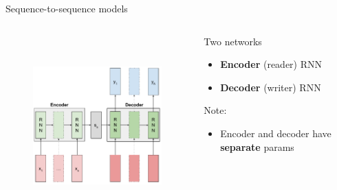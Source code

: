 \documentclass[12pt,aspectratio=169,handout]{beamer}
\begin{document}
\begin{frame}{Sequence-to-sequence models}
\vspace{-2em}
\begin{columns}[T] %
	\begin{column}{.59\textwidth}
	
		\begin{figure}[h]
		\includegraphics[height=7cm]{img/sequence_to_sequence_boxed.pdf}
	\end{figure}
	
	\end{column}
	\pause
	\begin{column}{.39\textwidth}
		\vspace{1cm}
		Two networks
		\begin{itemize}
			\item \textbf{Encoder} (reader) RNN
			\item \textbf{Decoder} (writer) RNN
		\end{itemize}
		\pause
		Note:
		\begin{itemize}
			\item Encoder and decoder have \textbf{separate} params
		\end{itemize}
	\end{column}
\end{columns}
\end{frame}
	
	
\end{document}

